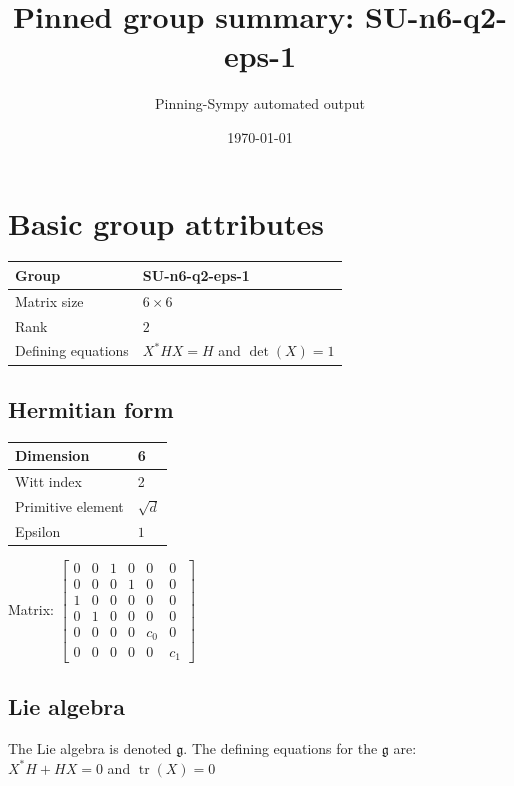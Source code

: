 \documentclass[11pt]{article}
\title{Pinned group summary: SU-n6-q2-eps-1}
\author{Pinning-Sympy automated output}
\date{\today}
\newcommand{\frakg}{\mathfrak{g}}
\theoremstyle{definition}
\begin{document}
\maketitle
\tableofcontents

\newpage

\section{Basic group attributes}

\def\arraystretch{1.2}
\begin{tabular}{|l|l|}
	\hline
    Group & SU-n6-q2-eps-1 \\
	\hline
    Matrix size & $6 \times 6$ \\
	\hline
    Rank & $2$ \\
	\hline
	Defining equations & $X^*HX=H$ and $\operatorname{det}(X)=1$ \\
	\hline
\end{tabular}
\def\arraystretch{1}

\subsection{Hermitian form}
\begin{tabular}{|l|l|}
    \hline
    Dimension & 6 \\
    \hline
    Witt index & 2 \\
    \hline
    Primitive element & $\sqrt{d}$ \\
    \hline
    Epsilon & $1$ \\
    \hline
\end{tabular}

\bigskip
\noindent Matrix: \(
\left[\begin{matrix}0 & 0 & 1 & 0 & 0 & 0\\0 & 0 & 0 & 1 & 0 & 0\\1 & 0 & 0 & 0 & 0 & 0\\0 & 1 & 0 & 0 & 0 & 0\\0 & 0 & 0 & 0 & c_{0} & 0\\0 & 0 & 0 & 0 & 0 & c_{1}\end{matrix}\right]
\)



\subsection{Lie algebra}

The Lie algebra is denoted $\frakg$. The defining equations for the $\frakg$ are: $X^*H + HX=0$ and $\operatorname{tr}(X)=0$
\end{document}
